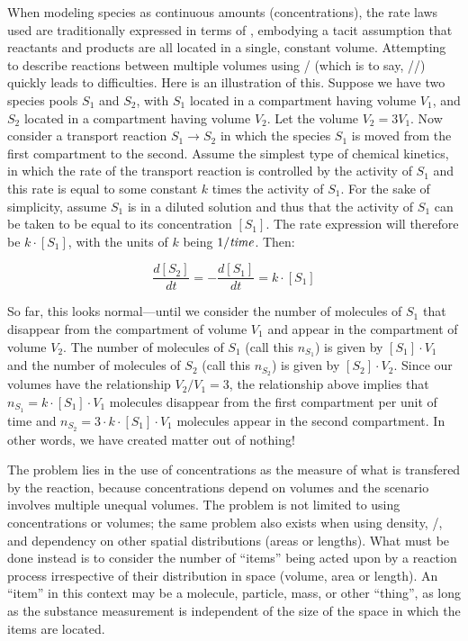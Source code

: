 When modeling species as continuous amounts (\eg concentrations),
the rate laws used are traditionally expressed in terms of
, embodying a
tacit assumption that reactants and products are all located in a
single, constant volume.  Attempting to describe reactions between
multiple volumes using /
(which is to say,
//) quickly
leads to difficulties.  Here is an illustration of this.  Suppose
we have two species pools $S_1$ and $S_2$, with $S_1$ located in a
compartment having volume $V_1$, and $S_2$ located in a
compartment having volume $V_2$.  Let the volume $V_2 = 3 V_1$.
Now consider a transport reaction $S_1 \rightarrow S_2$ in which
the species $S_1$ is moved from the first compartment to the
second.  Assume the simplest type of chemical kinetics, in which
the rate of the transport reaction is controlled by the activity
of $S_1$ and this rate is equal to some constant $k$ times the
activity of $S_1$.  For the sake of simplicity, assume $S_1$ is in
a diluted solution and thus that the activity of $S_1$ can be
taken to be equal to its concentration $[S_1]$.  The rate
expression will therefore be $k \cdot [S_1]$, with the
  units of $k$ being $1/\emph{time}$.  Then:

\begin{linenomath}
  \begin{equation*}
    \frac{d[S_2]}{dt} = -\frac{d[S_1]}{dt} = k \cdot [S_1]
  \end{equation*}
\end{linenomath}

So far, this looks normal---until we consider the number of
molecules of $S_1$ that disappear from the compartment of volume
$V_1$ and appear in the compartment of volume $V_2$.  The number
of molecules of $S_1$ (call this $n_{S_1}$) is given by $[S_1]
\cdot V_1$ and the number of molecules of $S_2$ (call this
$n_{S_2}$) is given by $[S_2] \cdot V_2$.  Since our volumes have
the relationship $V_2 / V_1 = 3$, the relationship above implies
that $n_{S_1} = k \cdot [S_1] \cdot V_1$ molecules disappear from
the first compartment per unit of time and $n_{S_2} = 3
\cdot k \cdot [S_1] \cdot V_1$ molecules appear in the second
compartment.  In other words, we have created matter out of
nothing!

The problem lies in the use of concentrations as the measure of
what is transfered by the reaction, because concentrations depend
on volumes and the scenario involves multiple unequal volumes.
The problem is not limited to using concentrations or volumes; the
same problem also exists when using density, \ie
{}/, and dependency on other spatial
distributions (\ie areas or lengths).  What must be done instead
is to consider the number of ``items'' being acted upon by a
reaction process irrespective of their distribution in space
(volume, area or length).  An ``item'' in this context may be a
molecule, particle, mass, or other ``thing'', as long as the
substance measurement is independent of the size of the space in
which the items are located.

